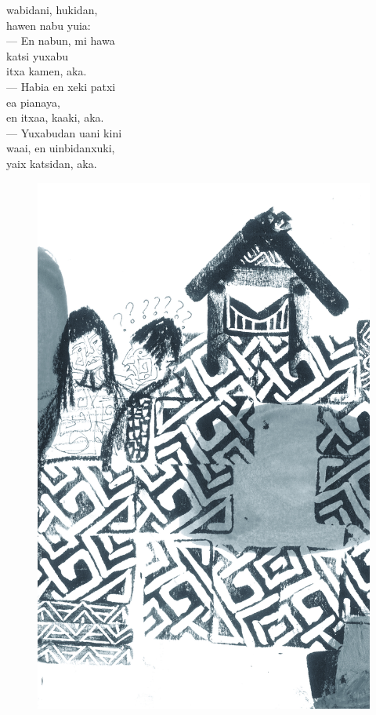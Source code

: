 \vspace{2em}

 wabidani, hukidan,\\
hawen nabu yuia:\\
--- En nabun, mi hawa\\
katsi yuxabu\\
itxa kamen, aka.\\
--- Habia en xeki patxi\\
ea pianaya,\\
en itxaa, kaaki, aka.\\
--- Yuxabudan uani kini\\
waai, en uinbidanxuki,\\
yaix katsidan, aka.

\vspace*{\fill}

\pagebreak
\thispagestyle{empty}
\begin{figure}
\vspace*{-1.6cm}
\hspace*{-2.2cm}\includegraphics[width=138mm]{./imgs/img9.jpg}
\end{figure}

